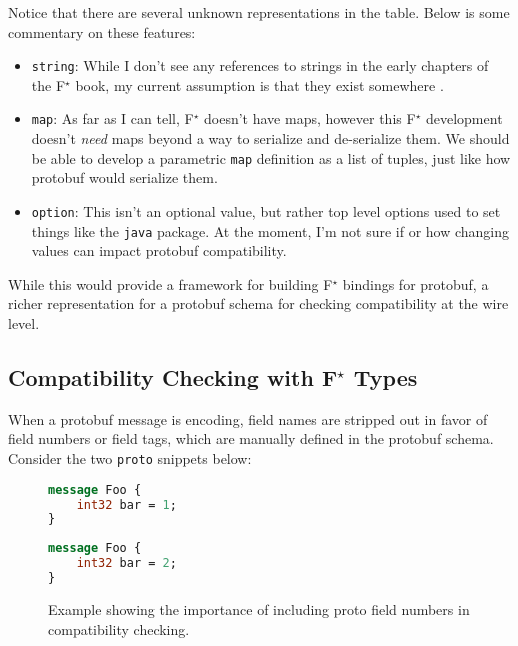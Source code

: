 \documentclass[11pt]{article}
\newcommand{\fstar}{F\(^\star\)}
\begin{document}
Notice that there are several unknown representations in the table. Below is
some commentary on these features:

\begin{itemize}
	\item \texttt{string}: While I don't see any references to strings in the early
	      chapters of the \fstar{} book, my current assumption is that they exist
	      somewhere \autocite{swamy2023proof}.
	\item \texttt{map}: As far as I can tell, \fstar{} doesn't have maps, however
	      this \fstar{} development doesn't \emph{need} maps beyond a way to serialize
	      and de-serialize them. We should be able to develop a parametric
	      \texttt{map} definition as a list of tuples, just like how protobuf would
	      serialize them.
	\item \texttt{option}: This isn't an optional value, but rather top level
	      options used to set things like the \texttt{java} package. At the moment,
	      I'm not sure if or how changing values can impact protobuf compatibility.
\end{itemize}

While this would provide a framework for building \fstar{} bindings for
protobuf, a richer representation for a protobuf schema for checking
compatibility at the wire level.

\subsection{Compatibility Checking with \fstar{} Types}

When a protobuf message is encoding, field names are stripped out in favor of
field numbers or field tags, which are manually defined in the protobuf
schema. Consider the two \texttt{proto} snippets below:

\begin{figure}[H]
	\centering
	\begin{minipage}[bt]{0.4\textwidth}
		\begin{lstlisting}[language=proto]
message Foo {
    int32 bar = 1;
}\end{lstlisting}
	\end{minipage}
	\hspace{1cm}
	\begin{minipage}[bt]{0.4\textwidth}
		\begin{lstlisting}[language=proto]
message Foo {
    int32 bar = 2;
}\end{lstlisting}
	\end{minipage}

	\caption[]{Example showing the importance of including proto field numbers in
		compatibility checking.}
\end{figure}
\end{document}
